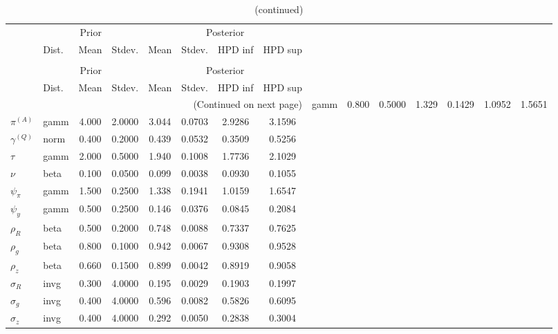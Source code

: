  
\begin{center}
\begin{longtable}{llcccccc} 
\caption{Results from Metropolis-Hastings (parameters)}
 \label{Table:MHPosterior:1}\\
\toprule 
  & \multicolumn{3}{c}{Prior}  &  \multicolumn{4}{c}{Posterior} \\
  \cmidrule(r{.75em}){2-4} \cmidrule(r{.75em}){5-8}
  & Dist. & Mean  & Stdev. & Mean & Stdev. & HPD inf & HPD sup\\
\midrule \endfirsthead 
\caption{(continued)}\\\toprule 
  & \multicolumn{3}{c}{Prior}  &  \multicolumn{4}{c}{Posterior} \\
  \cmidrule(r{.75em}){2-4} \cmidrule(r{.75em}){5-8}
  & Dist. & Mean  & Stdev. & Mean & Stdev. & HPD inf & HPD sup\\
\midrule \endhead 
\bottomrule \multicolumn{8}{r}{(Continued on next page)} \endfoot 
\bottomrule \endlastfoot 
${r_{A}}$ & gamm &   0.800 & 0.5000 &   1.329& 0.1429 &  1.0952 &  1.5651 \\ 
${\pi^{(A)}}$ & gamm &   4.000 & 2.0000 &   3.044& 0.0703 &  2.9286 &  3.1596 \\ 
${\gamma^{(Q)}}$ & norm &   0.400 & 0.2000 &   0.439& 0.0532 &  0.3509 &  0.5256 \\ 
${\tau}$ & gamm &   2.000 & 0.5000 &   1.940& 0.1008 &  1.7736 &  2.1029 \\ 
${\nu}$ & beta &   0.100 & 0.0500 &   0.099& 0.0038 &  0.0930 &  0.1055 \\ 
${\psi_\pi}$ & gamm &   1.500 & 0.2500 &   1.338& 0.1941 &  1.0159 &  1.6547 \\ 
${\psi_y}$ & gamm &   0.500 & 0.2500 &   0.146& 0.0376 &  0.0845 &  0.2084 \\ 
${\rho_R}$ & beta &   0.500 & 0.2000 &   0.748& 0.0088 &  0.7337 &  0.7625 \\ 
${\rho_{g}}$ & beta &   0.800 & 0.1000 &   0.942& 0.0067 &  0.9308 &  0.9528 \\ 
${\rho_z}$ & beta &   0.660 & 0.1500 &   0.899& 0.0042 &  0.8919 &  0.9058 \\ 
${\sigma_R}$ & invg &   0.300 & 4.0000 &   0.195& 0.0029 &  0.1903 &  0.1997 \\ 
${\sigma_{g}}$ & invg &   0.400 & 4.0000 &   0.596& 0.0082 &  0.5826 &  0.6095 \\ 
${\sigma_z}$ & invg &   0.400 & 4.0000 &   0.292& 0.0050 &  0.2838 &  0.3004 \\ 
\end{longtable}
 \end{center}
